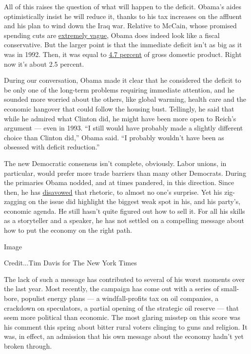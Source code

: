 All of this raises the question of what will happen to the deficit.
Obama's aides optimistically insist he will reduce it, thanks to his tax
increases on the affluent and his plan to wind down the Iraq war.
Relative to McCain, whose promised spending cuts are
\href{http://www.nytimes.com/2008/04/23/business/23leonhardt.html}{extremely
vague}, Obama does indeed look like a fiscal conservative. But the
larger point is that the immediate deficit isn't as big as it was in
1992. Then, it was equal to
\href{http://www.cbo.gov/budget/data/historical.pdf}{4.7 percent} of
gross domestic product. Right now it's about 2.5 percent.

During our conversation, Obama made it clear that he considered the
deficit to be only one of the long-term problems requiring immediate
attention, and he sounded more worried about the others, like global
warming, health care and the economic hangover that could follow the
housing bust. Tellingly, he said that while he admired what Clinton did,
he might have been more open to Reich's argument --- even in 1993. ``I
still would have probably made a slightly different choice than Clinton
did,'' Obama said. ``I probably wouldn't have been as obsessed with
deficit reduction.''

The new Democratic consensus isn't complete, obviously. Labor unions, in
particular, would prefer more trade barriers than many other Democrats.
During the primaries Obama nodded, and at times pandered, in this
direction. Since then, he has
\href{http://money.cnn.com/2008/06/18/magazines/fortune/easton_obama.fortune/index.htm?postversion=2008061815}{disavowed}
that rhetoric, to almost no one's surprise. Yet his zig-zagging on the
issue did highlight the biggest weak spot in his, and his party's,
economic agenda. He still hasn't quite figured out how to sell it. For
all his skills as a storyteller and a speaker, he has not settled on a
compelling message about how to put the economy on the right path.

Image

Credit...Tim Davis for The New York Times

The lack of such a message has contributed to several of his worst
moments over the last year. Most recently, the campaign has come out
with a series of small-bore, populist energy plans --- a
windfall-profits tax on oil companies, a crackdown on speculators, a
partial opening of the strategic oil reserve --- that seem more
political than economic. The most glaring misstep on this score was his
comment this spring about bitter rural voters clinging to guns and
religion. It was, in effect, an admission that his own message about the
economy hadn't yet broken through.

